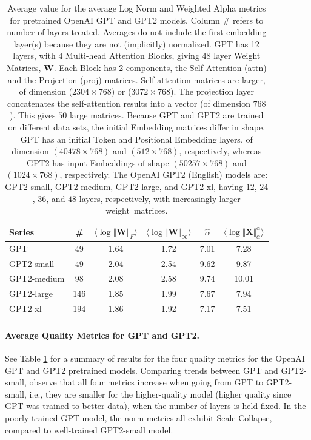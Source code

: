 \begin{table}[t]
\small
\begin{center}
\begin{tabular}{|p{1in}|c|c|c|c|c|}
\hline
 Series  & \#   & $\langle\log\Vert\mathbf{W}\Vert_{F}\rangle$ & $\langle\log\Vert\mathbf{W}\Vert_{\infty}\rangle$ & $\hat{\alpha}$ & $\langle\log\Vert\mathbf{X}\Vert^{\alpha}_{\alpha}\rangle$ \\
\hline
GPT & 49 & 1.64  & 1.72 & 7.01 & 7.28 \\
GPT2-small & 49 & 2.04  & 2.54& 9.62 & 9.87 \\
\hline
GPT2-medium & 98 & 2.08 & 2.58& 9.74 & 10.01 \\
GPT2-large & 146 & 1.85 & 1.99& 7.67 & 7.94 \\
GPT2-xl & 194 & 1.86 & 1.92 & 7.17 & 7.51 \\
\hline
\end{tabular}
\end{center}
\caption{Average value for the average Log Norm and Weighted Alpha metrics for pretrained OpenAI GPT and GPT2 models. 
Column \# refers to number of layers treated.  
Averages do not include the first embedding layer(s) because they are not (implicitly) normalized.  
GPT has 12 layers, with 4 Multi-head Attention Blocks, giving $48$ layer Weight Matrices, $\mathbf{W}$.
Each Block has 2 components, the Self Attention (attn) and the Projection (proj) matrices.  
Self-attention  matrices are larger, of dimension ($2304\times 768$) or ($3072\times 768$).
The projection layer concatenates the self-attention results into a vector (of dimension $768$).
This gives $50$ large matrices.
Because GPT and GPT2 are trained on different data sets, the initial Embedding matrices differ in shape.
GPT has an initial Token and Positional Embedding layers, of dimension $(40478\times 768)$ and $(512\times 768)$, respectively, whereas GPT2 has input Embeddings of shape $(50257\times 768)$ and $(1024\times 768)$, respectively. 
The OpenAI GPT2 (English) models are: GPT2-small, GPT2-medium, GPT2-large, and GPT2-xl, having $12$, $24$, $36$, and $48$ layers, respectively, with increasingly larger weight~matrices.
}
\label{table:nlp}
\end{table}


\paragraph{Average Quality Metrics for GPT and GPT2.}

See Table \ref{table:nlp} for a summary of results for the four quality metrics for the OpenAI GPT and GPT2 pretrained models.
Comparing trends between GPT and GPT2-small, 
observe that all four metrics increase when going from GPT to GPT2-small, i.e., they are smaller for the higher-quality model (higher quality since GPT was trained to better data), when the number of layers is held fixed.
In the poorly-trained GPT model, the norm metrics all exhibit Scale Collapse, compared to well-trained GPT2-small model.

